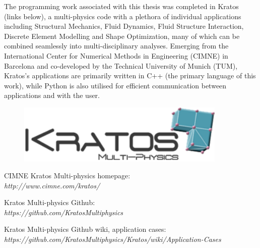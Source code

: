 The programming work associated with this thesis was completed in Kratos (links below), a multi-physics code with a plethora of individual applications including Structural Mechanics, Fluid Dynamics, Fluid Structure Interaction, Discrete Element Modelling and Shape Optimization, many of which can be combined seamlessly into multi-disciplinary analyses. Emerging from the International Center for Numerical Methods in Engineering (CIMNE) in Barcelona and co-developed by the Technical University of Munich (TUM), Kratos's applications are primarily written in C++ (the primary language of this work), while Python is also utilised for efficient communication between applications and with the user.

\vspace*{20mm}

\begin{figure}[H]
	\centering
	\def\svgwidth{\columnwidth}
	\includegraphics[width=10cm]{images/kratoslogo.png}
	\label{kratoslogo}
\end{figure}

\begin{center}
CIMNE Kratos Multi-physics homepage: \\
\textit{http://www.cimne.com/kratos/}

Kratos Multi-physics Github: \\
\textit{https://github.com/KratosMultiphysics}

Kratos Multi-physics Github wiki, application cases: \\
 \textit{https://github.com/KratosMultiphysics/Kratos/wiki/Application-Cases}
\end{center}